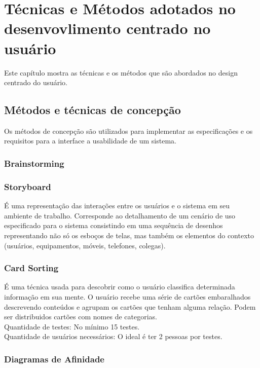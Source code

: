\chapter{Técnicas e Métodos adotados no desenvovlimento centrado no usuário}

	Este capítulo mostra as técnicas e os métodos que são abordados no design centrado do usuário.

\section{Métodos e técnicas de concepção}

Os métodos de concepção são utilizados para implementar as especificações e os requisitos para a interface a usabilidade de um sistema.

\subsection{Brainstorming}



\subsection{Storyboard}

É uma representação das interações entre os usuários e o sistema em seu ambiente de trabalho. Corresponde ao detalhamento de um cenário de uso especificado para o sistema consistindo em uma sequência de desenhos representando não só os esboços de telas, mas também os elementos do contexto (usuários, equipamentos, móveis, telefones, colegas).

\subsection{Card Sorting}

	É uma técnica usada para descobrir como o usuário classifica determinada informação em sua mente. O usuário recebe uma série de cartões embaralhados descrevendo conteúdos e agrupam os cartões que tenham alguma relação. Podem ser distribuidos cartões com nomes de categorias. \\
	
	Quantidade de testes: No mínimo 15 testes. \\
	Quantidade de usuários necessários: O ideal é ter 2 pessoas por testes.
	
\subsection{Diagramas de Afinidade}

